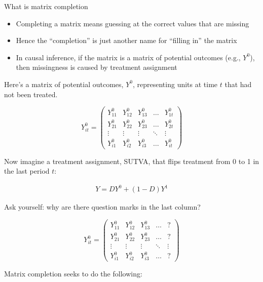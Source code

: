 \documentclass{beamer}
\begin{document}
\begin{frame}{What is matrix completion}

\begin{itemize}
\item Completing a matrix means guessing at the correct values that are missing 
\item Hence the ``completion'' is just another name for ``filling in'' the matrix 
\item In causal inference, if the matrix is a matrix of potential outcomes (e.g., $Y^0$), then missingness is caused by treatment assignment
\end{itemize}
\end{frame}

\begin{frame}[plain]


Here's a matrix of potential outcomes, $Y^0$, representing units at time $t$ that had not been treated. 
\begin{center}
\[ Y^0_{it}  =\begin{pmatrix}
    Y^0_{11} & Y^0_{12} & Y^0_{13} & \dots  & Y^0_{1t} \\
    Y^0_{21} & Y^0_{22} & Y^0_{23} & \dots  & Y^0_{2t} \\
    \vdots & \vdots & \vdots & \ddots & \vdots \\
    Y^0_{i1} & Y^0_{i2} & Y^0_{i3} & \dots  & Y^0_{it}
\end{pmatrix}\]
\end{center}

Now imagine a treatment assignment, SUTVA, that flips treatment from 0 to 1 in the last period $t$:

\begin{eqnarray*}
Y=DY^0 + (1-D)Y^1
\end{eqnarray*}

\end{frame}

\begin{frame}[plain]

Ask yourself: why are there question marks in the last column? 

\begin{center}
\[ Y^0_{it}  =\begin{pmatrix}
    Y^0_{11} & Y^0_{12} & Y^0_{13} & \dots  & ? \\
    Y^0_{21} & Y^0_{22} & Y^0_{23} & \dots  & ? \\
    \vdots & \vdots & \vdots & \ddots & \vdots \\
    Y^0_{i1} & Y^0_{i2} & Y^0_{i3} & \dots  & ?
\end{pmatrix}\]
\end{center}
Matrix completion seeks to do the following:



\end{frame}
\end{document}
